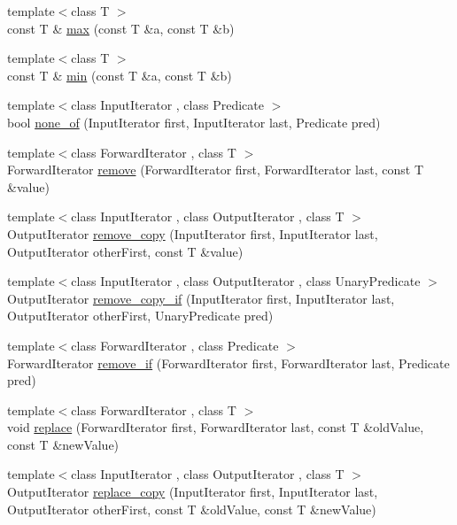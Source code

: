 \begin{DoxyCompactItemize}
\item 
{\footnotesize template$<$class T $>$ }\\const T \& \hyperlink{namespaceprism_a812456273adfa37979e79f07e731d412}{max} (const T \&a, const T \&b)
\item 
{\footnotesize template$<$class T $>$ }\\const T \& \hyperlink{namespaceprism_a10aff0aca673fb1837069dd8967e4738}{min} (const T \&a, const T \&b)
\item 
{\footnotesize template$<$class Input\+Iterator , class Predicate $>$ }\\bool \hyperlink{namespaceprism_a10c83b433c7f98fd4513f1b68c6db594}{none\+\_\+of} (Input\+Iterator first, Input\+Iterator last, Predicate pred)
\item 
{\footnotesize template$<$class Forward\+Iterator , class T $>$ }\\Forward\+Iterator \hyperlink{namespaceprism_aeddd21943bcf811c56f7d9d1bd4784f6}{remove} (Forward\+Iterator first, Forward\+Iterator last, const T \&value)
\item 
{\footnotesize template$<$class Input\+Iterator , class Output\+Iterator , class T $>$ }\\Output\+Iterator \hyperlink{namespaceprism_ab7b6fb407340e51749169560b48fb20c}{remove\+\_\+copy} (Input\+Iterator first, Input\+Iterator last, Output\+Iterator other\+First, const T \&value)
\item 
{\footnotesize template$<$class Input\+Iterator , class Output\+Iterator , class Unary\+Predicate $>$ }\\Output\+Iterator \hyperlink{namespaceprism_abfc7da1f951e480a26d58fc098b78844}{remove\+\_\+copy\+\_\+if} (Input\+Iterator first, Input\+Iterator last, Output\+Iterator other\+First, Unary\+Predicate pred)
\item 
{\footnotesize template$<$class Forward\+Iterator , class Predicate $>$ }\\Forward\+Iterator \hyperlink{namespaceprism_a2e9d25191ed83ea0a193f16d9c0a00b7}{remove\+\_\+if} (Forward\+Iterator first, Forward\+Iterator last, Predicate pred)
\item 
{\footnotesize template$<$class Forward\+Iterator , class T $>$ }\\void \hyperlink{namespaceprism_a6156070b98de7130b8c912ae3a6d333f}{replace} (Forward\+Iterator first, Forward\+Iterator last, const T \&old\+Value, const T \&new\+Value)
\item 
{\footnotesize template$<$class Input\+Iterator , class Output\+Iterator , class T $>$ }\\Output\+Iterator \hyperlink{namespaceprism_a16d85ecb70d2f216714a0146a057a105}{replace\+\_\+copy} (Input\+Iterator first, Input\+Iterator last, Output\+Iterator other\+First, const T \&old\+Value, const T \&new\+Value)

\end{DoxyCompactItemize}
